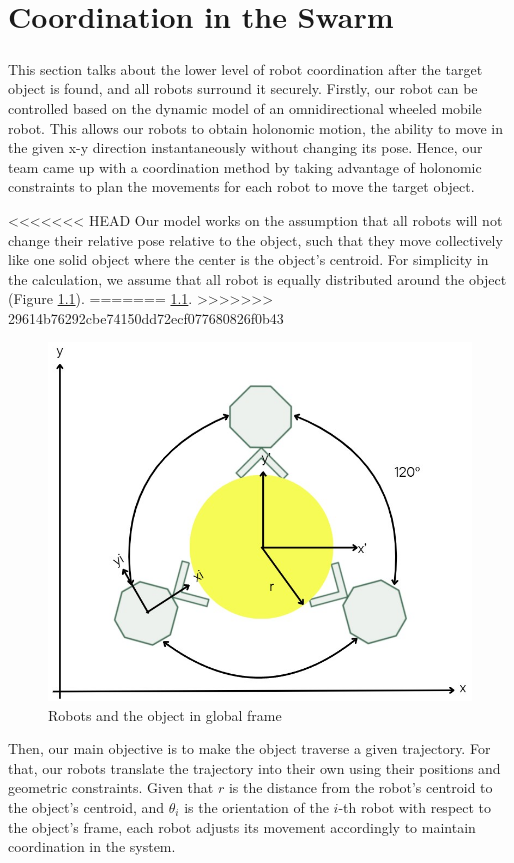 \chapter{Coordination in the Swarm}

\paragraph*{}
This section talks about the lower level of robot coordination after the target object is found, and all robots surround it securely. Firstly, our robot can be controlled based on the dynamic model of an omnidirectional wheeled mobile robot. This allows our robots to obtain holonomic motion, the ability to move in the given x-y direction instantaneously without changing its pose. Hence, our team came up with a coordination method by taking advantage of holonomic constraints to plan the movements for each robot to move the target object.

<<<<<<< HEAD
Our model works on the assumption that all robots will not change their relative pose relative to the object, such that they move collectively like one solid object where the center is the object's centroid. For simplicity in the calculation, we assume that all robot is equally distributed around the object (Figure \ref{fig:coordination-diagram}).
=======
\ref{fig:coordination-diagram}.
>>>>>>> 29614b76292cbe74150dd72ecf077680826f0b43

\begin{figure} [H]
    \centering
    \includegraphics[width=0.3\linewidth]{assets/images/coordination/robots_with_object.jpg}
    \caption{Robots and the object in global frame}
    \label{fig:coordination-diagram}
\end{figure}

Then, our main objective is to make the object traverse a given trajectory. For that, our robots translate the trajectory into their own using their positions and geometric constraints. Given that \( r \) is the distance from the robot's centroid to the object's centroid, and \( \theta_i \) is the orientation of the \( i \)-th robot with respect to the object's frame, each robot adjusts its movement accordingly to maintain coordination in the system.

